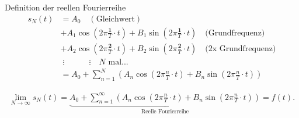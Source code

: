 \documentclass[12pt]{beamer}
\begin{document}
\begin{frame}{Definition der reellen Fourierreihe}
	\vspace*{-1cm}
	\begin{align*}    
		s_N(t) &= A_0 \quad (\text{Gleichwert}) \\
		&+ A_1 \cos(2\pi \frac{\mathbf{1}}{T} \cdot t) + B_1 \sin(2\pi \frac{\mathbf{1}}{T} \cdot t) \quad \text{(Grundfrequenz)} \\[1ex]
		&+ A_2 \cos(2\pi \frac{\mathbf{2}}{T} \cdot t) + B_2 \sin(2\pi \frac{\mathbf{2}}{T} \cdot t) \quad \text{(2x Grundfrequenz)} \\[1ex]
		&\;\vdots \quad\quad\quad \vdots \quad N \text{ mal...} \\
		&= A_0 + \sum_{n=1}^N \left(A_n \cos(2\pi \frac{n}{T} \cdot t) + B_n \sin(2\pi \frac{n}{T} \cdot t)\right)
	\end{align*}
	
	\pause
	\begin{align*}
		\lim_{N \rightarrow \infty} s_N(t) = \underbrace{A_0 + \sum_{n=1}^\infty \left(A_n \cos(2\pi \frac{n}{T} \cdot t) + B_n \sin(2\pi \frac{n}{T} \cdot t)\right)}_{\text{Reelle Fourierreihe}} = f(t).
	\end{align*}
\end{frame}
\end{document}
